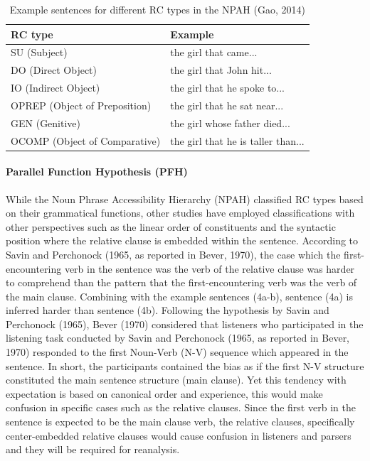\documentclass[
]{article}
\begin{document}
\vspace{1em}
\begin{table}
\centering
\caption{\label{tab:Table1_NPAH}Example sentences for different RC types in the NPAH (Gao, 2014)}
\centering
\begin{tabular}[t]{ll}
\toprule
RC type & Example\\
\midrule
SU (Subject) & the girl that came...\\
DO (Direct Object) & the girl that John hit...\\
IO (Indirect Object) & the girl that he spoke to...\\
OPREP (Object of Preposition) & the girl that he sat near...\\
GEN (Genitive) & the girl whose father died...\\
\addlinespace
OCOMP (Object of Comparative) & the girl that he is taller than...\\
\bottomrule
\end{tabular}
\end{table}
\vspace{1em}

\paragraph{Parallel Function Hypothesis
(PFH)}\label{parallel-function-hypothesis-pfh}

While the Noun Phrase Accessibility Hierarchy (NPAH) classified RC types
based on their grammatical functions, other studies have employed
classifications with other perspectives such as the linear order of
constituents and the syntactic position where the relative clause is
embedded within the sentence. According to Savin and Perchonock (1965,
as reported in Bever, 1970), the case which the first-encountering verb
in the sentence was the verb of the relative clause was harder to
comprehend than the pattern that the first-encountering verb was the
verb of the main clause. Combining with the example sentences (4a-b),
sentence (4a) is inferred harder than sentence (4b). Following the
hypothesis by Savin and Perchonock (1965), Bever (1970) considered that
listeners who participated in the listening task conducted by Savin and
Perchonock (1965, as reported in Bever, 1970) responded to the first
Noun-Verb (N-V) sequence which appeared in the sentence. In short, the
participants contained the bias as if the first N-V structure
constituted the main sentence structure (main clause). Yet this tendency
with expectation is based on canonical order and experience, this would
make confusion in specific cases such as the relative clauses. Since the
first verb in the sentence is expected to be the main clause verb, the
relative clauses, specifically center-embedded relative clauses would
cause confusion in listeners and parsers and they will be required for
reanalysis.
\end{document}
